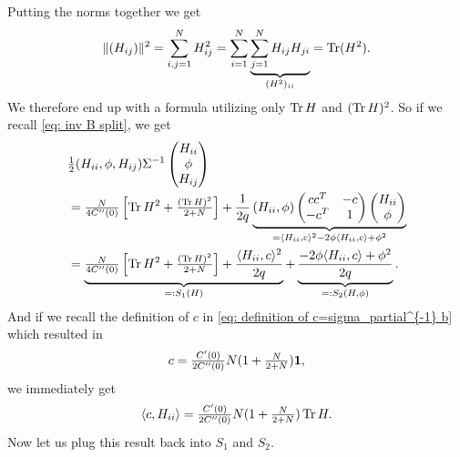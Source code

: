 Putting the norms together we get
\begin{align*}
	\|(H_{ij})\|^2 = \sum_{i,j=1}^N H_{ij}^2
	= \sum_{i=1}^N \underbrace{\sum_{j=1}^N H_{ij}H_{ji}}_{(H^2)_{ii}}
	= \operatorname{Tr}(H^2).
\end{align*}
We therefore end up with a formula utilizing only \(\operatorname{Tr} H\) and \((\operatorname{Tr} H)^2\).
So if we recall \eqref{eq: inv B split}, we get
\begin{align*}
		&\tfrac12
		( H_{ii},\phi, H_{ij} )\Sigma^{-1}
		\begin{pmatrix}
			H_{ii}\\
			\phi\\
			H_{ij}
		\end{pmatrix}\\
		&= \tfrac{N}{4C''(0)}\left[
			\operatorname{Tr} H^2 + \tfrac{(\operatorname{Tr} H)^2}{2+N}
		\right]
		+ \frac1{2q} \underbrace{
			(H_{ii}, \phi)\begin{pmatrix}
			cc^T & -c\\
			-c^T & 1
		\end{pmatrix}
		\begin{pmatrix}
			H_{ii}\\ \phi
		\end{pmatrix}
		}_{
			= \langle H_{ii}, c\rangle^2 - 2\phi \langle H_{ii}, c\rangle + \phi^2
		}\\
		&= \underbrace{\tfrac{N}{4C''(0)}\left[
			\operatorname{Tr} H^2 + \tfrac{(\operatorname{Tr} H)^2}{2+N}
		\right]
		+ \frac{\langle H_{ii}, c\rangle^2}{2q}}_{
			=: S_1(H)
		} + \underbrace{
			\frac{- 2\phi \langle H_{ii}, c\rangle + \phi^2}{2q}
		}_{=:S_2(H, \phi)}.
\end{align*}
And if we recall the definition of \(c\) in \eqref{eq: definition of
c=sigma_partial^{-1} b} which resulted in
\[
	c=\tfrac{C'(0)}{2C''(0)}N( 1 + \tfrac{N}{2+N} )\mathbf{1},
\]
we immediately get
\[
	\langle c, H_{ii}\rangle = 
	\tfrac{C'(0)}{2C''(0)}N( 1 + \tfrac{N}{2+N} )\operatorname{Tr} H.
\]
Now let us plug this result back into \(S_1\) and \(S_2\).